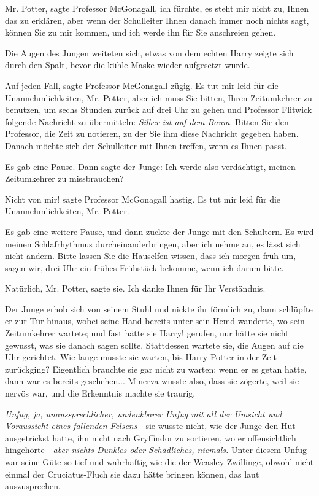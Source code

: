 \glqq Mr. Potter\grqq{}, sagte Professor McGonagall, \glqq ich fürchte, es steht
mir nicht zu, Ihnen das zu erklären, aber wenn der Schulleiter Ihnen danach
immer noch nichts sagt, können Sie zu mir kommen, und ich werde ihn für Sie
anschreien gehen.\grqq{}

Die Augen des Jungen weiteten sich, etwas von dem echten Harry zeigte sich durch
den Spalt, bevor die kühle Maske wieder aufgesetzt wurde.

\glqq Auf jeden Fall\grqq{}, sagte Professor McGonagall zügig. \glqq Es tut mir
leid für die Unannehmlichkeiten, Mr. Potter, aber ich muss Sie bitten, Ihren
Zeitumkehrer zu benutzen, um sechs Stunden zurück auf drei Uhr zu gehen und
Professor Flitwick folgende Nachricht zu übermitteln: \emph{Silber ist auf dem
Baum}. Bitten Sie den Professor, die Zeit zu notieren, zu der Sie ihm diese
Nachricht gegeben haben. Danach möchte sich der Schulleiter mit Ihnen treffen,
wenn es Ihnen passt.\grqq{}

Es gab eine Pause. Dann sagte der Junge: \glqq Ich werde also verdächtigt,
meinen Zeitumkehrer zu missbrauchen?\grqq{}

\glqq Nicht von mir!\grqq{} sagte Professor McGonagall hastig. \glqq Es tut mir
leid für die Unannehmlichkeiten, Mr. Potter.\grqq{}

Es gab eine weitere Pause, und dann zuckte der Junge mit den Schultern. \glqq Es
wird meinen Schlafrhythmus durcheinanderbringen, aber ich nehme an, es lässt
sich nicht ändern. Bitte lassen Sie die Hauselfen wissen, dass ich morgen früh
um, sagen wir, drei Uhr ein frühes Frühstück bekomme, wenn ich darum
bitte.\grqq{}

\glqq Natürlich, Mr. Potter\grqq{}, sagte sie. \glqq Ich danke Ihnen für Ihr
Verständnis.\grqq{}

Der Junge erhob sich von seinem Stuhl und nickte ihr förmlich zu, dann schlüpfte
er zur Tür hinaus, wobei seine Hand bereits unter sein Hemd wanderte, wo sein
Zeitumkehrer wartete; und fast hätte sie \glqq Harry!\grqq{} gerufen, nur hätte
sie nicht gewusst, was sie danach sagen sollte. Stattdessen wartete sie, die
Augen auf die Uhr gerichtet. Wie lange musste sie warten, bis Harry Potter in
der Zeit zurückging? Eigentlich brauchte sie gar nicht zu warten; wenn er es
getan hatte, dann war es bereits geschehen... Minerva wusste also, dass sie
zögerte, weil sie nervös war, und die Erkenntnis machte sie traurig.

\emph{Unfug, ja, unaussprechlicher, undenkbarer Unfug mit all der Umsicht und
Voraussicht eines fallenden Felsens }- sie wusste nicht, wie der Junge den Hut
ausgetrickst hatte, ihn nicht nach Gryffindor zu sortieren, wo er offensichtlich
hingehörte - \emph{aber nichts Dunkles oder Schädliches, niemals.} Unter diesem
Unfug war seine Güte so tief und wahrhaftig wie die der Weasley-Zwillinge,
obwohl nicht einmal der Cruciatus-Fluch sie dazu hätte bringen können, das laut
auszusprechen.

